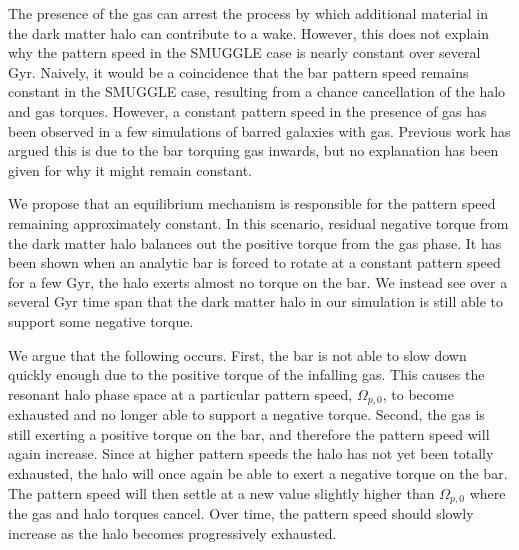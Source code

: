 \documentclass{natureprintstyle}
\begin{document}
The presence of the gas can arrest the process by which additional material in
the dark matter halo can contribute to a wake. However, this does not explain
why the pattern speed in the SMUGGLE case is nearly constant over several Gyr.
Naively, it would be a coincidence that the bar pattern speed remains constant
in the SMUGGLE case, resulting from a chance cancellation of the halo and gas
torques. However, a constant pattern speed in the presence of gas has been
observed in a few simulations of barred galaxies with
gas.\cite{1993AA...268...65F, 2010ApJ...719.1470V} Previous work has argued
this is due to the bar torquing gas inwards, but no explanation has been given
for why it might remain constant.

We propose that an equilibrium mechanism is responsible for the pattern speed
remaining approximately constant. In this scenario, residual negative torque
from the dark matter halo balances out the positive torque from the gas phase.
It has been shown when an analytic bar is forced to rotate at a constant
pattern speed for a few Gyr, the halo exerts almost no torque on the
bar.\cite{2022MNRAS.513..768C} We instead see over a several Gyr time span
that the dark matter halo in our simulation is still able to support some
negative torque.

We argue that the following occurs. First, the bar is not able to slow down
quickly enough due to the positive torque of the infalling gas. This causes
the resonant halo phase space at a particular pattern speed, $\Omega_{p,0}$,
to become exhausted and no longer able to support a negative torque. Second,
the gas is still exerting a positive torque on the bar, and therefore the
pattern speed will again increase. Since at higher pattern speeds the halo has
not yet been totally exhausted, the halo will once again be able to exert a
negative torque on the bar. The pattern speed will then settle at a new value
slightly higher than $\Omega_{p,0}$ where the gas and halo torques cancel.
Over time, the pattern speed should slowly increase as the halo becomes
progressively exhausted.
\end{document}
